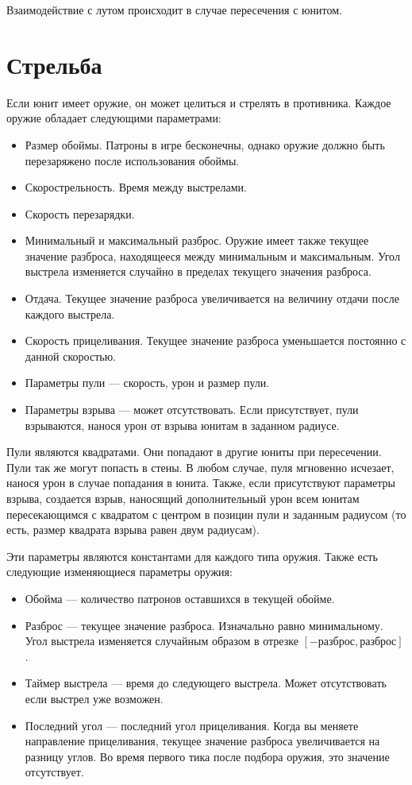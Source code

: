 Взаимодействие с лутом происходит в случае пересечения с юнитом.

\section{Стрельба}

Если юнит имеет оружие, он может целиться и стрелять в противника. Каждое оружие обладает следующими параметрами:
\begin{itemize}
      \item Размер обоймы. Патроны в игре бесконечны, однако оружие должно быть перезаряжено после использования обоймы.
      \item Скорострельность. Время между выстрелами.
      \item Скорость перезарядки.
      \item Минимальный и максимальный разброс. Оружие имеет также текущее значение разброса, находящееся между минимальным и максимальным.
            Угол выстрела изменяется случайно в пределах текущего значения разброса.
      \item Отдача. Текущее значение разброса увеличивается на величину отдачи после каждого выстрела.
      \item Скорость прицеливания. Текущее значение разброса уменьшается постоянно с данной скоростью.
      \item Параметры пули --- скорость, урон и размер пули.
      \item Параметры взрыва --- может отсутствовать.
            Если присутствует, пули взрываются, нанося урон от взрыва юнитам в заданном радиусе.
\end{itemize}

Пули являются квадратами. Они попадают в другие юниты при пересечении.
Пули так же могут попасть в стены.
В любом случае, пуля мгновенно исчезает, нанося урон в случае попадания в юнита.
Также, если присутствуют параметры взрыва, создается взрыв, наносящий дополнительный урон всем юнитам пересекающимся с квадратом
с центром в позиции пули и заданным радиусом (то есть, размер квадрата взрыва равен двум радиусам).

Эти параметры являются константами для каждого типа оружия. Также есть следующие изменяющиеся параметры оружия:
\begin{itemize}
      \item Обойма --- количество патронов оставшихся в текущей обойме.
      \item Разброс --- текущее значение разброса. Изначально равно минимальному.
            Угол выстрела изменяется случайным образом в отрезке $[-разброс, разброс]$.
      \item Таймер выстрела --- время до следующего выстрела. Может отсутствовать если выстрел уже возможен.
      \item Последний угол --- последний угол прицеливания. Когда вы меняете направление прицеливания,
            текущее значение разброса увеличивается на разницу углов.
            Во время первого тика после подбора оружия, это значение отсутствует.
\end{itemize}

